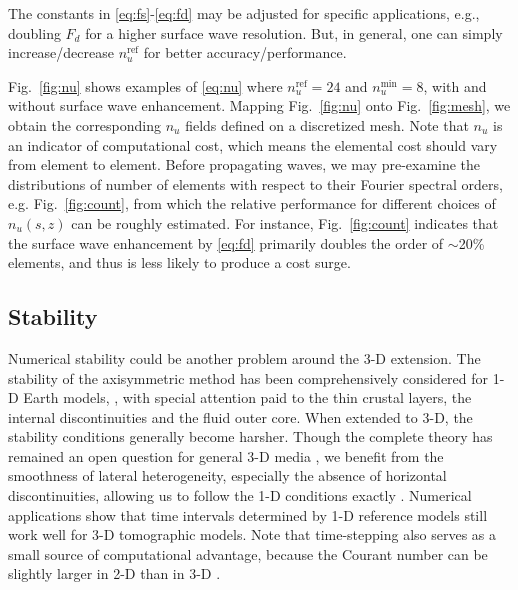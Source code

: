 \documentclass[extra,referee]{gji}
\begin{document}
The constants in \eqref{eq:fs}-\eqref{eq:fd} may be adjusted 
for specific applications, e.g., doubling $F_d$ for a higher 
surface wave resolution. But, in general, one can simply
increase/decrease $n_u^\text{ref}$ for better accuracy/performance.

Fig.~\ref{fig:nu} shows examples of \eqref{eq:nu} where 
$n_u^\text{ref}=24$ and $n_u^\text{min}=8$, 
with and without surface wave enhancement. 
Mapping Fig.~\ref{fig:nu} onto Fig.~\ref{fig:mesh}, we obtain
the corresponding $n_u$ fields defined on a discretized mesh.
Note that $n_u$ is an indicator of computational cost,
which means the elemental cost should vary from element to element.
Before propagating waves, we may pre-examine the distributions of number of elements 
with respect to their Fourier spectral orders, e.g. Fig.~\ref{fig:count}, from which 
the relative performance for different choices of $n_u\left(s,z\right)$
 can be roughly estimated.
For instance, Fig.~\ref{fig:count} indicates that the surface wave 
enhancement by \eqref{eq:fd} primarily doubles the order of  
$\sim$20\% elements, and thus is less likely to produce a cost surge.



\subsection{Stability}
Numerical stability could be another problem around the 3-D extension.
The stability of the axisymmetric method has been 
comprehensively considered for 1-D Earth models, 
\cite[]{nissen2008sem}, with special attention paid to the thin 
crustal layers, the internal discontinuities and the fluid outer core.
When extended to 3-D, the stability conditions generally become harsher.
Though the complete theory has remained an open question for 
general 3-D media \cite[]{gottlieb2001spectral}, we benefit 
from the smoothness of lateral heterogeneity, especially 
the absence of horizontal discontinuities,
allowing us to follow the 1-D conditions exactly
\cite[]{gottlieb2001spectral, gottlieb1981stability}. Numerical
applications show that time intervals determined by 1-D 
reference models still work well for 3-D tomographic models.
Note that time-stepping also serves as a small source of computational 
advantage, because the Courant number can be slightly larger 
in 2-D than in 3-D \cite[]{komatitsch1998spectral}.
 
 
\end{document}

